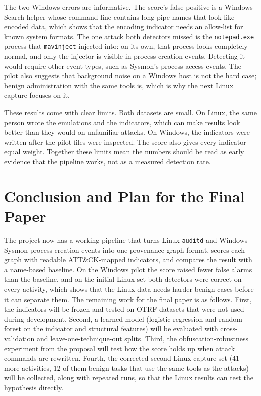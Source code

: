 \documentclass[conference]{IEEEtran}
\begin{document}
The two Windows errors are informative. The score's false positive is a
Windows Search helper whose command line contains long pipe names that look
like encoded data, which shows that the encoding indicator needs an
allow-list for known system formats. The one attack both detectors missed is
the \texttt{notepad.exe} process that \texttt{mavinject} injected into: on
its own, that process looks completely normal, and only the injector is
visible in process-creation events. Detecting it would require other event
types, such as Sysmon's process-access events. The pilot also suggests that
background noise on a Windows host is not the hard case; benign
administration with the same tools is, which is why the next Linux capture
focuses on it.

These results come with clear limits. Both datasets are small. On Linux, the
same person wrote the emulations and the indicators, which can make results
look better than they would on unfamiliar attacks. On Windows, the
indicators were written after the pilot files were inspected. The score also
gives every indicator equal weight. Together these limits mean the numbers
should be read as early evidence that the pipeline works, not as a measured
detection rate.

\section{Conclusion and Plan for the Final Paper}
The project now has a working pipeline that turns Linux \texttt{auditd} and
Windows Sysmon process-creation events into one provenance-graph format,
scores each graph with readable ATT\&CK-mapped indicators, and compares the
result with a name-based baseline. On the Windows pilot the score raised
fewer false alarms than the baseline, and on the initial Linux set both
detectors were correct on every activity, which shows that the Linux data
needs harder benign cases before it can separate them. The remaining work
for the final paper is as follows. First, the indicators will be frozen and
tested on OTRF datasets that were not used during development. Second, a
learned model (logistic regression and random forest on the indicator and
structural features) will be evaluated with cross-validation and
leave-one-technique-out splits. Third, the obfuscation-robustness experiment
from the proposal will test how the score holds up when attack commands are
rewritten. Fourth, the corrected second Linux capture set (41 more
activities, 12 of them benign tasks that use the same tools as the attacks)
will be collected, along with repeated runs, so that the Linux results can
test the hypothesis directly.
\end{document}
